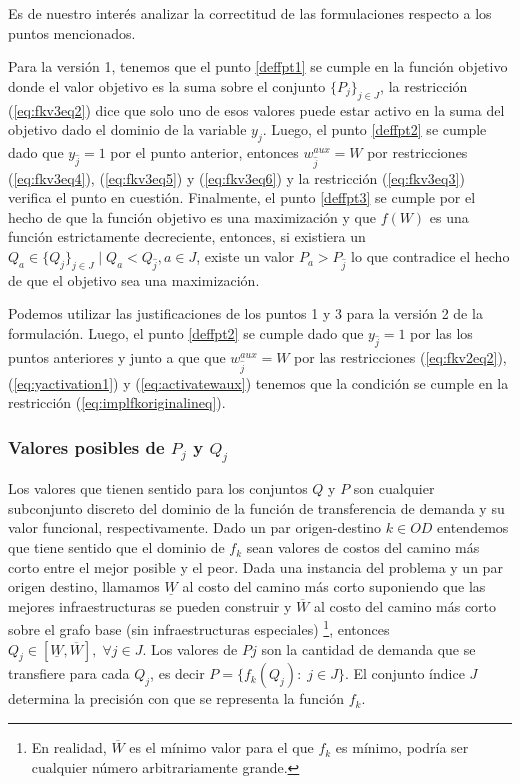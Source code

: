 \documentclass{article}
\begin{document}
  Es de nuestro interés analizar la correctitud de las formulaciones respecto a los puntos mencionados.

  Para la versión 1, tenemos que el punto \ref{deffpt1} se cumple en la función objetivo donde el valor objetivo es la suma sobre el conjunto $\{P_j\}_{j \in J}$, la restricción (\ref{eq:fkv3eq2}) dice que solo uno de esos valores puede estar activo en la suma del objetivo dado el dominio de la variable $y_j$. Luego, el punto \ref{deffpt2} se cumple dado que $y_{\hat{j}} = 1$ por el punto anterior, entonces $w_{\hat{j}}^{aux} = W$ por restricciones (\ref{eq:fkv3eq4}), (\ref{eq:fkv3eq5}) y (\ref{eq:fkv3eq6}) y la restricción (\ref{eq:fkv3eq3}) verifica el punto en cuestión. Finalmente, el punto \ref{deffpt3} se cumple por el hecho de que la función objetivo es una maximización y que $f(W)$ es una función estrictamente decreciente, entonces, si existiera un $Q_a \in \{Q_j\}_{j \in J} \;|\; Q_a < Q_{\hat{j}}, a \in J$, existe un valor $P_a > P_{\hat{j}}$ lo que contradice el hecho de que el objetivo sea una maximización.

  Podemos utilizar las justificaciones de los puntos 1 y 3 para la versión 2 de la formulación. Luego, el punto \ref{deffpt2} se cumple dado que $y_{\hat{j}} = 1$ por las los puntos anteriores y junto a que que $w^{aux}_{\hat{j}} = W$ por las restricciones (\ref{eq:fkv2eq2}), (\ref{eq:yactivation1}) y (\ref{eq:activatewaux}) tenemos que la condición se cumple en la restricción (\ref{eq:implfkoriginalineq}).

  \subsubsection{Valores posibles de $P_j$ y $Q_j$}

  Los valores que tienen sentido para los conjuntos $Q$ y $P$ son cualquier subconjunto discreto del dominio de la función de transferencia de demanda y su valor funcional, respectivamente. Dado un par origen-destino $k \in OD$ entendemos que tiene sentido que el dominio de $f_k$ sean valores de costos del camino más corto entre el mejor posible y el peor. Dada una instancia del problema y un par origen destino, llamamos $\underline{W}$ al costo del camino más corto suponiendo que las mejores infraestructuras se pueden construir y $\overline{W}$ al costo del camino más corto sobre el grafo base (sin infraestructuras especiales) \footnote{En realidad, $\overline{W}$ es el mínimo valor para el que $f_k$ es mínimo, podría ser cualquier número arbitrariamente grande.}, entonces $Q_j \in [\underline{W}, \overline{W}],\; \forall j \in J$. Los valores de $Pj$ son la cantidad de demanda que se transfiere para cada $Q_j$, es decir $P = \{f_k(Q_j):\; j \in J\}$. El conjunto índice $J$ determina la precisión con que se representa la función $f_k$.
\end{document}
